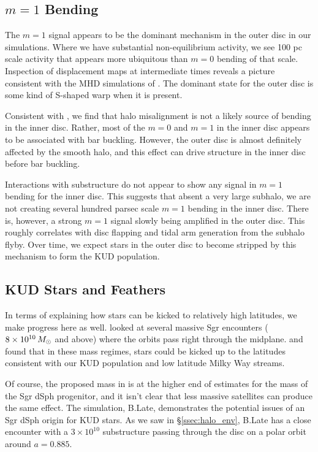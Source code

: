 \subsection{$m=1$ Bending}


The $m=1$ signal appears to be the dominant mechanism in the outer disc in our simulations. Where we have substantial non-equilibrium activity, we see 100 pc scale activity that appears more ubiquitous than $m=0$ bending of that scale. Inspection of displacement maps at intermediate times reveals a picture consistent with the MHD simulations of \citet{gomez_2017}. The dominant state for the outer disc is some kind of S-shaped warp when it is present. 

Consistent with \citet{gomez_2017}, we find that halo misalignment is not a likely source of bending in the inner disc. Rather, most of the $m=0$ and $m=1$ in the inner disc appears to be associated with bar buckling. However, the outer disc is almost definitely affected by the smooth halo, and this effect can drive structure in the inner disc before bar buckling.

Interactions with substructure do not appear to show any signal in $m=1$ bending for the inner disc. This suggests that absent a very large subhalo, we are not creating several hundred parsec scale $m=1$ bending in the inner disc. There is, however, a strong $m=1$ signal slowly being amplified in the outer disc. This roughly correlates with disc flapping and tidal arm generation from the subhalo flyby. Over time, we expect stars in the outer disc to become stripped by this mechanism to form the KUD population. 


\subsection{KUD Stars and Feathers}

In terms of explaining how stars can be kicked to relatively high latitudes, we make progress here as well. \citet{laporte_2018_b} looked at several massive Sgr encounters ($8 \times 10^{10} \, M_\odot$ and above) where the orbits pass right through the midplane. \citet{laporte_2018_b} and \citet{laporte_2019_feathers} found that in these mass regimes, stars could be kicked up to the latitudes consistent with our KUD population and low latitude Milky Way streams. 


Of course, the proposed mass in \citet{laporte_2018_b} is at the higher end of estimates for the mass of the Sgr dSph progenitor, and it isn't clear that less massive satellites can produce the same effect. The simulation, B.Late, demonstrates the potential issues of an Sgr dSph origin for KUD stars. As we saw in \S\ref{ssec:halo_env}, B.Late has a close encounter with a $3 \times 10^{10}$ substructure passing through the disc on a polar orbit around $a=0.885$. 

